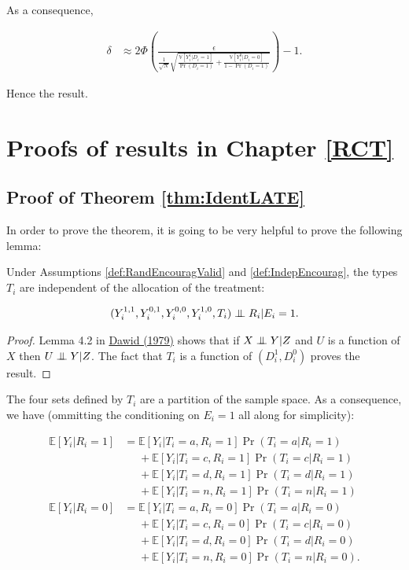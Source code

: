 \documentclass[]{book}
\newcommand{\esp}[1]{\mathbb{E}[ #1 ]}
\newcommand\Ind{\protect\mathpalette{\protect\independenT}{\perp}}
\def\independenT#1#2{\mathrel{\setbox0\hbox{$#1#2$}\copy0\kern-\wd0\mkern4mu\box0}}
\newcommand{\var}[1]{\mathbb{V}[ #1 ]}
\theoremstyle{definition}
\theoremstyle{definition}
\theoremstyle{definition}
\theoremstyle{remark}
\let\BeginKnitrBlock\begin \let\EndKnitrBlock\end
\begin{document}
As a consequence,

\begin{align*}
\delta & \approx 2\Phi\left(\frac{\epsilon}{\frac{1}{\sqrt{N}}\sqrt{\frac{\var{Y_i^1|D_i=1}}{\Pr(D_i=1)}+\frac{\var{Y_i^0|D_i=0}}{1-\Pr(D_i=1)}}}\right)-1.
\end{align*}

Hence the result.

\section{Proofs of results in Chapter
\ref{RCT}}\label{proofs-of-results-in-chapter-refrct}

\subsection{Proof of Theorem \ref{thm:IdentLATE}}\label{proofIdentLATE}

In order to prove the theorem, it is going to be very helpful to prove
the following lemma:

\BeginKnitrBlock{lemma}[Unconfounded Types]
\protect\hypertarget{lem:UnconfTypes}{}{\label{lem:UnconfTypes}
\iffalse (Unconfounded Types) \fi{} }Under Assumptions
\ref{def:RandEncouragValid} and \ref{def:IndepEncourag}, the types
\(T_i\) are independent of the allocation of the treatment:

\begin{align*}
(Y_i^{1,1},Y_i^{0,1},Y_i^{0,0},Y_i^{1,0},T_i)\Ind R_i|E_i=1.
\end{align*}
\EndKnitrBlock{lemma}

\BeginKnitrBlock{proof}
\iffalse{} {Proof. } \fi{}Lemma 4.2 in
\href{https://www.jstor.org/stable/2984718}{Dawid (1979)} shows that if
\(X\Ind Y|Z\) and \(U\) is a function of \(X\) then \(U\Ind Y|Z\). The
fact that \(T_i\) is a function of \((D_i^1,D^0_i)\) proves the result.
\EndKnitrBlock{proof}

The four sets defined by \(T_i\) are a partition of the sample space. As
a consequence, we have (ommitting the conditioning on \(E_i=1\) all
along for simplicity):

\begin{align*}
\esp{Y_i|R_i=1} & = \esp{Y_i|T_i=a,R_i=1}\Pr(T_i=a|R_i=1)\\
                & \phantom{=}+ \esp{Y_i|T_i=c,R_i=1}\Pr(T_i=c|R_i=1) \\
                            & \phantom{=} + \esp{Y_i|T_i=d,R_i=1}\Pr(T_i=d|R_i=1)\\
                            & \phantom{=} + \esp{Y_i|T_i=n,R_i=1}\Pr(T_i=n|R_i=1)\\
\esp{Y_i|R_i=0} & = \esp{Y_i|T_i=a,R_i=0}\Pr(T_i=a|R_i=0)\\
                & \phantom{=} + \esp{Y_i|T_i=c,R_i=0}\Pr(T_i=c|R_i=0) \\
                            & \phantom{=} + \esp{Y_i|T_i=d,R_i=0}\Pr(T_i=d|R_i=0)\\
                            & \phantom{=}+ \esp{Y_i|T_i=n,R_i=0}\Pr(T_i=n|R_i=0).
\end{align*}
\end{document}
